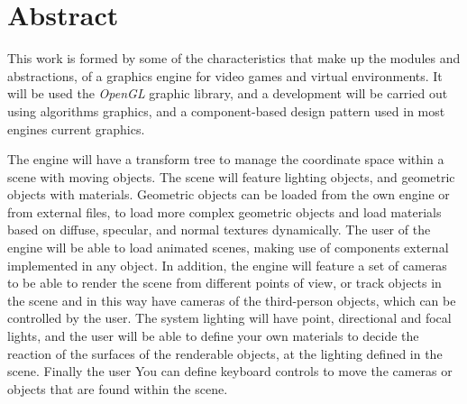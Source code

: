 \documentclass[a4paper]{book}
\begin{document}

\chapter*{Abstract}

This work is formed by some of the characteristics that make up the modules
and abstractions, of a graphics engine for video games and virtual environments. It will be used
the \textit{OpenGL} graphic library, and a development will be carried out using algorithms
graphics, and a component-based design pattern used in most engines current graphics.


The engine will have a transform tree to manage the coordinate space
within a scene with moving objects. The scene will feature lighting objects,
and geometric objects with materials. Geometric objects can be loaded from the
own engine or from external files, to load more complex geometric objects and
load materials based on diffuse, specular, and normal textures dynamically.
The user of the engine will be able to load animated scenes, making use of components
external implemented in any object. In addition, the engine will feature a set of
cameras to be able to render the scene from different points of view,
or track objects in the scene and in this way have cameras of the
third-person objects, which can be controlled by the user. The system
lighting will have point, directional and focal lights, and the user will be able to
define your own materials to decide the reaction of the surfaces of the
renderable objects, at the lighting defined in the scene. Finally the user
You can define keyboard controls to move the cameras or objects that are found
within the scene.




\tableofcontents
\cleardoublepage
\listoffigures %
\end{document}
